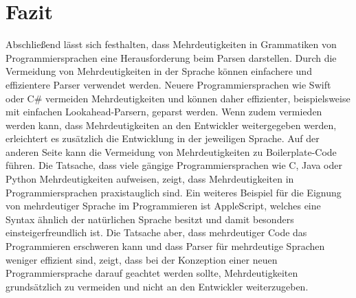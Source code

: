 \documentclass[runningheads]{llncs}
\begin{document}
    \section{Fazit}\label{sec:zusammenfassung}

    Abschließend lässt sich festhalten, dass Mehrdeutigkeiten in Grammatiken von Programmiersprachen
    eine Herausforderung beim Parsen darstellen.
    Durch die Vermeidung von Mehrdeutigkeiten in der Sprache können einfachere und effizientere Parser verwendet werden\footnotemark[3].
    Neuere Programmiersprachen wie Swift\cite{apple2024swift} oder C\# vermeiden Mehrdeutigkeiten
    und können daher effizienter, beispielsweise mit einfachen Lookahead-Parsern, geparst werden.
    Wenn zudem vermieden werden kann, dass Mehrdeutigkeiten an den Entwickler weitergegeben werden,
    erleichtert es zusätzlich die Entwicklung in der jeweiligen Sprache.
    Auf der anderen Seite kann die Vermeidung von Mehrdeutigkeiten zu Boilerplate-Code führen.
    Die Tatsache, dass viele gängige Programmiersprachen wie C, Java oder Python Mehrdeutigkeiten aufweisen,
    zeigt, dass Mehrdeutigkeiten in Programmiersprachen praxistauglich sind.
    Ein weiteres Beispiel für die Eignung von mehrdeutiger Sprache im Programmieren ist AppleScript\cite{apple2016script},
    welches eine Syntax ähnlich der natürlichen Sprache besitzt
    und damit besonders einsteigerfreundlich ist.
    Die Tatsache aber, dass mehrdeutiger Code das Programmieren erschweren kann
    und dass Parser für mehrdeutige Sprachen weniger effizient sind\footnotemark[3],
    zeigt, dass bei der Konzeption einer neuen Programmiersprache
    darauf geachtet werden sollte, Mehrdeutigkeiten grundsätzlich zu vermeiden
    und nicht an den Entwickler weiterzugeben.


%
%
%


    
    
\end{document}
